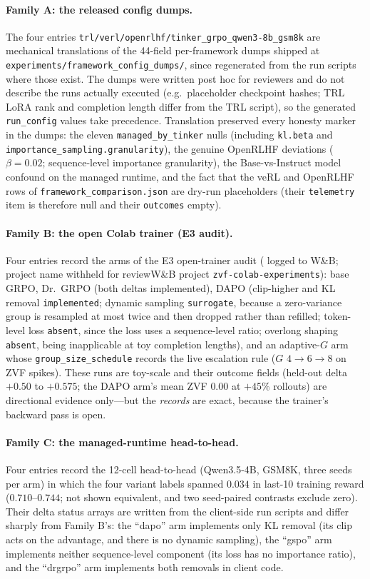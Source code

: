 \paragraph{Family A: the released config dumps.}
The four entries \texttt{trl/verl/openrlhf/tinker_grpo_qwen3-8b_gsm8k} are
mechanical translations of the 44-field per-framework dumps shipped at
\texttt{experiments/framework_config_dumps/}, since regenerated from the run
scripts where those exist. The dumps were written post hoc for reviewers and
do not describe the runs actually executed (e.g.\ placeholder checkpoint
hashes; TRL LoRA rank and completion length differ from the TRL script), so
the generated \texttt{run\_config} values take precedence. Translation preserved every honesty marker in the
dumps: the eleven \texttt{managed_by_tinker} nulls (including \texttt{kl.beta}
and \texttt{importance_sampling.granularity}), the genuine OpenRLHF deviations
($\beta{=}0.02$; sequence-level importance granularity), the Base-vs-Instruct
model confound on the managed runtime, and the fact that the veRL and OpenRLHF
rows of \texttt{framework_comparison.json} are dry-run placeholders (their
\texttt{telemetry} item is therefore null and their \texttt{outcomes} empty).

\paragraph{Family B: the open Colab trainer (E3 audit).}
Four entries record the arms of the E3 open-trainer audit (\ifdefined\ANONYMOUSBUILD
logged to W\&B; project name withheld for review\else W\&B project
\texttt{zvf-colab-experiments}\fi): base GRPO, Dr.~GRPO (both deltas
implemented), DAPO (clip-higher and KL removal \texttt{implemented}; dynamic
sampling \texttt{surrogate}, because a zero-variance group is resampled at most
twice and then dropped rather than refilled; token-level loss \texttt{absent},
since the loss uses a sequence-level ratio; overlong shaping \texttt{absent},
being inapplicable at toy completion lengths), and an adaptive-$G$ arm whose
\texttt{group_size_schedule} records the live escalation rule ($G$
$4{\to}6{\to}8$ on ZVF spikes). These runs are toy-scale and their outcome
fields (held-out delta $+0.50$ to $+0.575$; the DAPO arm's mean ZVF $0.00$ at
$+45\%$ rollouts) are directional evidence only---but the \emph{records} are
exact, because the trainer's backward pass is open.

\paragraph{Family C: the managed-runtime head-to-head.}
Four entries record the 12-cell head-to-head (Qwen3.5-4B, GSM8K, three seeds
per arm) in which the four variant labels spanned $0.034$ in last-10
training reward ($0.710$--$0.744$; not shown equivalent, and two seed-paired
contrasts exclude zero). Their delta status arrays are written from the
client-side run scripts and differ sharply from Family B's: the ``dapo'' arm
implements only KL removal (its clip acts on the advantage, and there is no
dynamic sampling), the ``gspo'' arm implements neither sequence-level
component (its loss has no importance ratio), and the ``drgrpo'' arm
implements both removals in client code.

